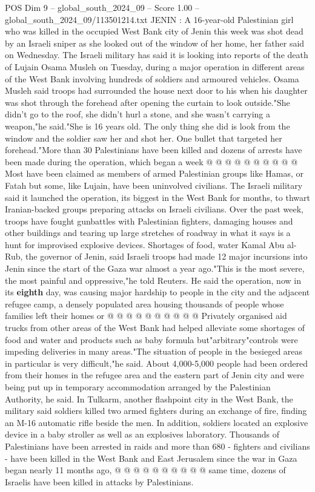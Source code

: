 \begin{textsample}{POS Dim 9 – global\_south\_2024\_09 – Score 1.00 – global\_south\_2024\_09/113501214.txt}  \label{ex:f9_pos_256}
JENIN : A 16-year-old Palestinian girl who was killed in the occupied West Bank city of Jenin this week was shot dead by an Israeli sniper as she looked out of the window of her home, her father said on Wednesday.
The Israeli military has said it is looking into reports of the death of Lujain Osama Musleh on Tuesday, during a major operation in different areas of the West Bank involving hundreds of soldiers and armoured vehicles.
Osama Musleh said troops had surrounded the house next door to his when his daughter was shot through the forehead after opening the curtain to look outside."She didn't go to the roof, she didn't hurl a stone, and she wasn't carrying a weapon,"he said."She is 16 years old.
The only thing she did is look from the window and the soldier saw her and shot her.
One bullet that targeted her forehead."More than 30 Palestinians have been killed and dozens of arrests have been made during the operation, which began a week @ @ @ @ @ @ @ @ @ @ Most have been claimed as members of armed Palestinian groups like Hamas, or Fatah but some, like Lujain, have been uninvolved civilians.
The Israeli military said it launched the operation, its biggest in the West Bank for months, to thwart Iranian-backed groups preparing attacks on Israeli civilians.
Over the past week, troops have fought gunbattles with Palestinian fighters, damaging houses and other buildings and tearing up large stretches of roadway in what it says is a hunt for improvised explosive devices.
Shortages of food, water Kamal Abu al-Rub, the governor of Jenin, said Israeli troops had made 12 major incursions into Jenin since the start of the Gaza war almost a year ago."This is the most severe, the most painful and oppressive,"he told Reuters.
He said the operation, now in its \textbf{eighth} day, was causing major hardship to people in the city and the adjacent refugee camp, a densely populated area housing thousands of people whose families left their homes or @ @ @ @ @ @ @ @ @ @ Privately organised aid trucks from other areas of the West Bank had helped alleviate some shortages of food and water and products such as baby formula but"arbitrary"controls were impeding deliveries in many areas."The situation of people in the besieged areas in particular is very difficult,"he said.
About 4,000-5,000 people had been ordered from their homes in the refugee area and the eastern part of Jenin city and were being put up in temporary accommodation arranged by the Palestinian Authority, he said.
In Tulkarm, another flashpoint city in the West Bank, the military said soldiers killed two armed fighters during an exchange of fire, finding an M-16 automatic rifle beside the men.
In addition, soldiers located an explosive device in a baby stroller as well as an explosives laboratory.
Thousands of Palestinians have been arrested in raids and more than 680 - fighters and civilians - have been killed in the West Bank and East Jerusalem since the war in Gaza began nearly 11 months ago, @ @ @ @ @ @ @ @ @ @ same time, dozens of Israelis have been killed in attacks by Palestinians.

\end{textsample}
